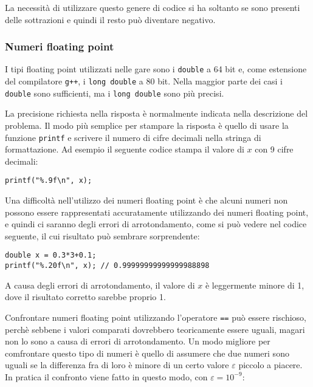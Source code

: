 La necessità di utilizzare questo genere di codice
si ha soltanto se sono presenti delle sottrazioni e
quindi il resto può diventare negativo.

\subsubsection{Numeri floating point}


I tipi floating point utilizzati nelle gare
sono i \texttt{double} a 64 bit e, come estensione del
compilatore \texttt{g++}, i \texttt{long double} a 80 bit.
Nella maggior parte dei casi i \texttt{double} sono sufficienti,
ma i \texttt{long double} sono più precisi.

La precisione richiesta nella risposta è normalmente 
indicata nella descrizione del problema.
Il modo più semplice per stampare la risposta
è quello di usare la funzione \texttt{printf}
e scrivere il numero di cifre decimali nella stringa di formattazione.
Ad esempio il seguente codice stampa
il valore di $x$ con 9 cifre decimali:

\begin{lstlisting}
printf("%.9f\n", x);
\end{lstlisting}

Una difficoltà nell'utilizzo dei numeri floating point
è che alcuni numeri non possono essere rappresentati 
accuratamente utilizzando dei numeri floating point,
e quindi ci saranno degli errori di arrotondamento, come
si può vedere nel codice seguente, il cui risultato può sembrare 
sorprendente:

\begin{lstlisting}
double x = 0.3*3+0.1;
printf("%.20f\n", x); // 0.99999999999999988898
\end{lstlisting}

A causa degli errori di arrotondamento,
il valore di $x$ è leggermente minore di 1,
dove il risultato corretto sarebbe proprio 1.

Confrontare numeri floating point utilizzando
l'operatore \texttt{==} può essere rischioso,
perchè sebbene i valori comparati dovrebbero teoricamente
essere uguali, magari non lo sono a causa di errori di arrotondamento.
Un modo migliore per comfrontare questo tipo di numeri
è quello di assumere che due numeri sono uguali se la differenza fra di loro 
è minore di un certo valore $\varepsilon$ piccolo a piacere.
In pratica il confronto viene fatto in questo modo, con $\varepsilon=10^{-9}$:

